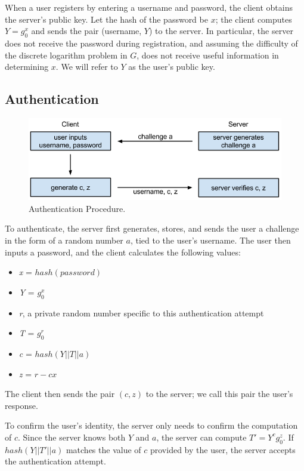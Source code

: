 \documentclass[11pt]{article}
\begin{document}
When a user registers by entering a username and password, the client obtains the server's public key.  Let the hash of the password be $x$; the client computes $Y = g_0 ^ x$ and sends the pair (username, $Y$) to the server.  In particular, the server does not receive the password during registration, and assuming the difficulty of the discrete logarithm problem in $G$, does not receive useful information in determining $x$.  We will refer to $Y$ as the user's public key.\cite{Lum}


\subsection{Authentication}
\begin{figure}[h]
  \centering
\includegraphics[scale=0.65]{auth.png}

 \caption{Authentication Procedure.}
 \label{fig:authentication}
\end{figure}

To authenticate, the server first generates, stores, and sends the user a challenge in the form of a random number $a$, tied to the user's username.  The user then inputs a password, and the client calculates the following values:
\begin{itemize}
  \item {\em x} = $hash(password)$
  \item {\em Y} = $g_0 ^ x$
  \item {\em r}, a private random number specific to this authentication attempt
  \item {\em T} = $g_0 ^ r$
  \item {\em c} = $hash(Y || T || a)$
  \item {\em z} = $r - cx$
\end{itemize}
The client then sends the pair $(c, z)$ to the server; we call this pair the user's response.


To confirm the user's identity, the server only needs to confirm the computation of $c$.  Since the server knows both $Y$ and $a$, the server can compute $T' = Y^cg_0^z$.  If $hash(Y || T' || a)$ matches the value of $c$ provided by the user, the server accepts the authentication attempt.\cite{Lum}
\end{document}
